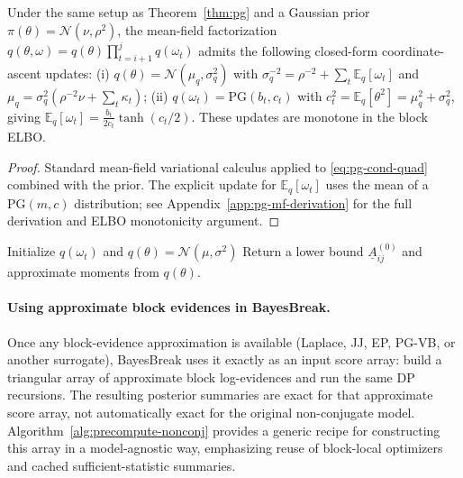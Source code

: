 \begin{proposition}
\label{prop:pg-mf}
Under the same setup as Theorem~\ref{thm:pg} and a Gaussian prior $\pi(\theta)=\mathcal{N}(\nu,\rho^2)$,
the mean-field factorization $q(\theta,\omega)=q(\theta)\prod_{t=i+1}^j q(\omega_t)$ admits the
following closed-form coordinate-ascent updates:
(i) $q(\theta)=\mathcal{N}(\mu_q,\sigma_q^2)$ with
$\sigma_q^{-2}=\rho^{-2}+\sum_t \mathbb{E}_q[\omega_t]$ and
$\mu_q=\sigma_q^2(\rho^{-2}\nu+\sum_t \kappa_t)$;
(ii) $q(\omega_t)=\mathrm{PG}(b_t, c_t)$ with $c_t^2=\mathbb{E}_q[\theta^2]=\mu_q^2+\sigma_q^2$,
giving $\mathbb{E}_q[\omega_t]=\tfrac{b_t}{2 c_t}\tanh(c_t/2)$. These updates are monotone in the
block ELBO.
\end{proposition}

\begin{proof}
Standard mean-field variational calculus applied to \eqref{eq:pg-cond-quad} combined with the prior.
The explicit update for $\mathbb{E}_q[\omega_t]$ uses the mean of a $\mathrm{PG}(m,c)$ distribution;
see Appendix~\ref{app:pg-mf-derivation} for the full derivation and ELBO monotonicity argument.
\end{proof}

\begin{algorithm}[H]
\caption{GLMBlock\_PG\_VB$(y,m,i,j,\nu,\rho^2)$ \quad (Gaussian prior, PG mean-field)}
\label{alg:pg-vb}
Initialize $q(\omega_t)$ and $q(\theta)=\mathcal{N}(\mu,\sigma^2)$\;
Return a lower bound $\underline{A}^{(0)}_{ij}$ and approximate moments from $q(\theta)$.
\end{algorithm}

\paragraph{Using approximate block evidences in BayesBreak.}
Once any block-evidence approximation is available (Laplace, JJ, EP, PG-VB, or another surrogate), BayesBreak uses it exactly as an input score array: build a triangular array of approximate block log-evidences and run the same DP recursions. The resulting posterior summaries are exact for that approximate score array, not automatically exact for the original non-conjugate model.
Algorithm~\ref{alg:precompute-nonconj} provides a generic recipe for constructing this array in a model-agnostic way, emphasizing reuse of block-local optimizers and cached sufficient-statistic summaries.

